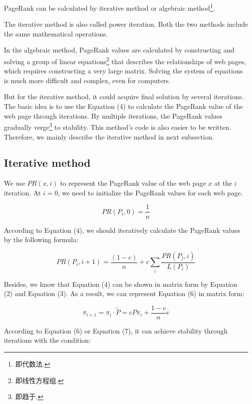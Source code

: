 \documentclass[lettersize,journal,12pt,conference]{IEEEtran}
\begin{document}
PageRank can be calculated by iterative method or algebraic method\footnote[1]{即代数法.}. 

The iterative method is also called power iteration. Both the two methods include the same mathematical operations. 

In the algebraic method, PageRank values are calculated by constructing and solving a group of linear equations\footnote[2]{即线性方程组.} that describes the relationships of web pages, which requires constructing a very large matrix. Solving the system of equations is much more difficult and complex, even for computers.

But for the iterative method, it could acquire final solution by several iterations. The basic idea is to use the Equation (4) to calculate the PageRank value of the web page through iterations. By multiple iterations, the PageRank values gradually verge\footnote[3]{即趋于.} to stability. This method's code is also easier to be written. Therefore, we mainly describe the iterative method in next subsection. 

\subsection{Iterative method}

We use $PR(x, i)$ to represent the PageRank value of the web page $x$ at the $i$ iteration. At $i = 0$, we need to initialize the PageRank values for each web page.

\begin{equation}
	\label{eq:5}
	PR(P_i, 0) = \frac{1}{n}
\end{equation}

According to Equation (4), we should iteratively calculate the PageRank values by the following formula:

\begin{equation}
	\label{eq:6}
	PR(P_i, i+1) = \frac{(1 - c)}{n} + c \sum_{i} \frac{PR(P_j, i)}{L(P_i)}
\end{equation}

Besides, we know that Equation (4) can be shown in matrix form by Equation (2) and Equation (3). As a result, we can represent Equation (6) in matrix form:

\begin{equation}
	\label{eq:7}
	\pi_{i+1} = \pi_i \cdot \widetilde{P} = cP\pi_i + \frac{1 - c}{n} e
\end{equation}

According to Equation (6) or Equation (7), it can achieve stability through iterations with the condition:
\end{document}
